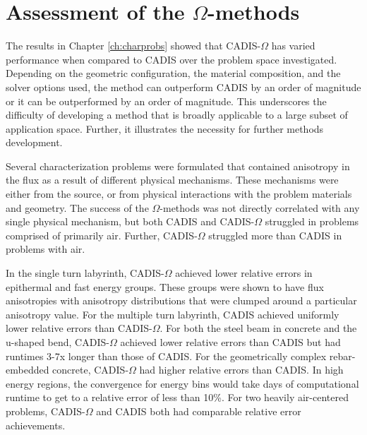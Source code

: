 \section{Assessment of the $\Omega$-methods}
\label{sec:assessments}

The results in Chapter \ref{ch:charprobs} showed that CADIS-$\Omega$ has varied
performance when compared to CADIS over the problem space investigated.
Depending on the geometric configuration, the material composition, and the
solver options used, the method can outperform CADIS by an order of magnitude or
it can be outperformed by an order of magnitude. This underscores the difficulty
of developing a method that is broadly applicable to a large subset of
application space. Further, it illustrates the necessity for further methods
development.

Several characterization problems were formulated that contained anisotropy in the
flux as a result of different physical mechanisms. These mechanisms were
either from the source, or from physical interactions with the problem materials
and geometry. The success of the $\Omega$-methods was not directly correlated
with any single physical mechanism, but both CADIS and CADIS-$\Omega$ struggled
in problems comprised of primarily air. Further, CADIS-$\Omega$ struggled more
than CADIS in problems with air.

In the single turn labyrinth, CADIS-$\Omega$ achieved lower relative errors in
epithermal and fast energy groups. These groups were shown to have flux
anisotropies with anisotropy distributions that were clumped around a particular
anisotropy value.
For the multiple turn labyrinth, CADIS achieved uniformly lower relative errors
than CADIS-$\Omega$. For both the steel beam in concrete and the u-shaped bend,
CADIS-$\Omega$ achieved lower relative errors than CADIS but had runtimes 3-7x
longer than those of CADIS. For the geometrically complex rebar-embedded
concrete, CADIS-$\Omega$ had higher relative errors than CADIS. In high energy
regions, the convergence for energy bins would take days of computational runtime
to get to a relative error of less than 10\%. For two heavily air-centered
problems, CADIS-$\Omega$ and CADIS both had comparable relative error
achievements.

